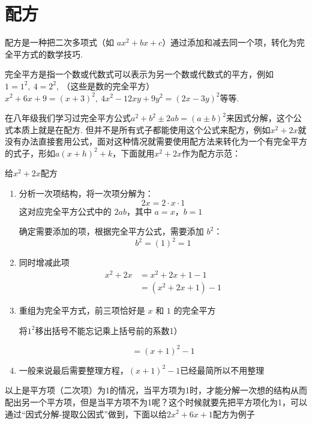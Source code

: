 \documentclass[lang=cn, 10pt, titlestyle=display, oneside]{elegantbook}
\begin{document}
\section{配方}



配方是一种把二次多项式（如 \(ax^2 + bx + c\)）通过添加和减去同一个项，转化为完全平方式的数学技巧.
\par
\begin{remark}
    完全平方是指一个数或代数式可以表示为另一个数或代数式的平方，例如\( 1=1^2,\ 4=2^2,\ \)（这些是数的完全平方）\(x^2+6x+9=(x+3)^2,\ 4x^2-12xy+9y^2=(2x-3y)^2\)等等.
\end{remark}
\par
在八年级我们学习过完全平方公式\(a^2+b^2\pm2ab=(a\pm b)^2\)来因式分解，这个公式本质上就是在配方. 但并不是所有式子都能使用这个公式来配方，例如\(x^2+2x\)就没有办法直接套用公式，面对这种情况就需要使用配方法来转化为一个有完全平方的式子，形如\(a(x+h)^2+k\)，下面就用\(x^2+2x\)作为配方示范：
\begin{example}
给\(x^2+2x\)配方
\end{example}
\par
\begin{solution}
    \begin{enumerate}
  \item 分析一次项结构，将一次项分解为：\\
  \[
  2x = 2 \cdot x \cdot 1
  \]
  这对应完全平方公式中的 \(2ab\)，其中 \(a = x\)，\(b = 1\)
  
  确定需要添加的项，根据完全平方公式，需要添加 \(b^2\)：
  \[
  b^2 = (1)^2 = 1
  \]
  
  \item 同时增减此项
  \begin{align*}
  x^2 + 2x &= x^2 + 2x + 1 - 1 \\
            &= (x^2 + 2x + 1) - 1
  \end{align*}
  
  \item 重组为完全平方式，前三项恰好是 \(x\) 和 \(1\) 的完全平方
  \begin{remark}
  将$1^2$移出括号不能忘记乘上括号前的系数1）
  \end{remark}
  \[
  = (x + 1)^2-1
  \]
  \item 一般来说最后需要整理方程，$(x + 1)^2-1$已经最简所以不用整理
\end{enumerate}

\end{solution}
以上是平方项（二次项）为1的情况，当平方项为1时，才能分解一次想的结构从而配出另一个平方项，但是当平方项不为1呢？这个时候就要先把平方项化为1，可以通过“因式分解-提取公因式”做到，下面以给\(2x^2 + 6x+1\)配方为例子
\end{document}
